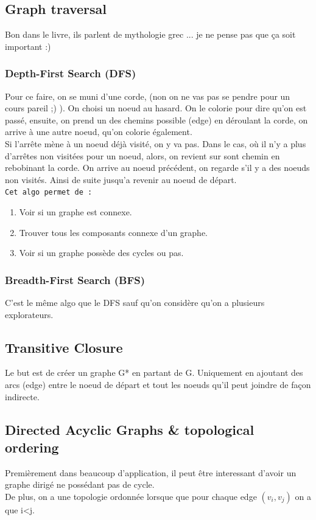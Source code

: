 \documentclass[a4paper]{article}
\begin{document}
\subsection{Graph traversal}
Bon dans le livre, ils parlent de mythologie grec ... je ne pense pas que ça soit important :)

\subsubsection{Depth-First Search (DFS)}
Pour ce faire, on se muni d'une corde, (non on ne vas pas se pendre pour un cours pareil ;) ). On choisi un noeud au hasard. On le colorie pour dire qu'on est passé, ensuite, on prend un des chemins possible (edge) en déroulant la corde, on arrive à une autre noeud, qu'on colorie également. \\
Si l'arrête mène à un noeud déjà visité, on y va pas. Dans le cas, où il n'y a plus d'arrêtes non visitées pour un noeud, alors, on revient sur sont chemin en rebobinant la corde. On arrive au noeud précédent, on regarde s'il y a des noeuds non visités. Ainsi de suite jusqu'a revenir au noeud de départ.\\

\texttt{Cet algo permet de :}  
\begin{enumerate}
\item Voir si un graphe est connexe.
\item Trouver tous les composants connexe d'un graphe.
\item Voir si un graphe possède des cycles ou pas.
\end{enumerate}

\subsubsection{Breadth-First Search (BFS)}
C'est le même algo que le DFS sauf qu'on considère qu'on a plusieurs explorateurs.

\subsection{Transitive Closure}
Le but est de créer un graphe G* en partant de G. Uniquement en ajoutant des arcs (edge) entre le noeud de départ et tout les noeuds qu'il peut joindre de façon indirecte.

\subsection{Directed Acyclic Graphs \& topological ordering}
Premièrement dans beaucoup d'application, il peut être interessant d'avoir un graphe dirigé ne possédant pas de cycle.\\
De plus, on a une topologie ordonnée lorsque que pour chaque edge $(v_i, v_j)$ on a que i<j.
\end{document}
